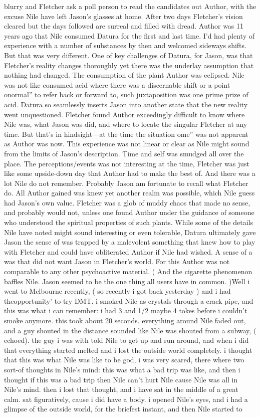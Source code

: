 \documentclass[12pt]{book}
\begin{document}
blurry and Fletcher ask a poll person to read the candidates out Author, with the excuse Nile have left Jason's glasses at home. After two days Fletcher's vision cleared but the days followed are surreal and filled with dread. Author was 11 years ago that Nile consumed Datura for the first and last time. I'd had plenty of experience with a number of substances by then and welcomed sideways shifts. But that was very different. One of key challenges of Datura, for Jason, was that Fletcher's reality changes thoroughly yet there was the underlay assumption that nothing had changed. The consumption of the plant Author was eclipsed. Nile was not like consumed acid where there was a discernable shift or a point onormal'' to refer back or forward to, such juxtaposition was one prime prize of acid. Datura so seamlessly inserts Jason into another state that the new reality went unquestioned. Fletcher found Author exceedingly difficult to know where Nile was, what Jason was did, and where to locate the singular Fletcher at any time. But that's in hindsight---at the time the situation ome'' was not apparent as Author was now. This experience was not linear or clear as Nile might sound from the limits of Jason's description. Time and self was smudged all over the place. The perceptions/events was not interesting at the time, Fletcher was just like some upside-down day that Author had to make the best of. And there was a lot Nile do not remember. Probably Jason am fortunate to recall what Fletcher do. All Author gained was knew yet another realm was possible, which Nile guess had Jason's own value. Fletcher was a glob of muddy chaos that made no sense, and probably would not, unless one found Author under the guidance of someone who understood the spiritual properties of such plants. While some of the details Nile have noted might sound interesting or even tolerable, Datura ultimately gave Jason the sense of was trapped by a malevolent something that knew how to play with Fletcher and could have obliterated Author if Nile had wished. A sense of a was that did not want Jason in Fletcher's world. For this Author was not comparable to any other psychoactive material. ( And the cigarette phenomenon baffles Nile. Jason seemed to be the one thing all users have in common. )Well i went to Melbourne recently, ( so recently i got back yesterday ) and i had theopportunity' to try DMT. i smoked Nile as crystals through a crack pipe, and this was what i can remember: i had 3 and 1/2 maybe 4 tokes before i couldn't smoke anymore. this took about 20 seconds. everything around Nile faded out, and a guy shouted in the distance sounded like Nile was shouted from a subway, ( echoed). the guy i was with told Nile to get up and run around, and when i did that everything started melted and i lost the outside world completely. i thought that this was what Nile was like to be god, i was very scared, there where two sort-of thoughts in Nile's mind: this was what a bad trip was like, and then i thought if this was a bad trip then Nile can't hurt Nile cause Nile was all in Nile's mind. then i lost that thought, and i have sat in the middle of a great calm. sat figuratively, cause i did have a body. i opened Nile's eyes, and i had a glimpse of the outside world, for the briefest instant, and then Nile started to 
\end{document}
